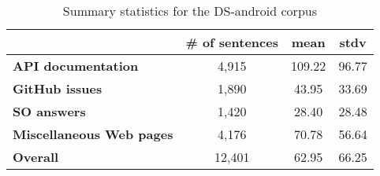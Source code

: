 \begin{table}[!h]
\centering    
\begin{small}
\begin{threeparttable}
\begin{tabular}{lccc}

\hline



 & \# of sentences & mean & stdv  \\

\hline
\hline

\textbf{API documentation} 
& 4,915 & 109.22 & 96.77
\\
\textbf{GitHub issues} 
& 1,890 &  43.95 & 33.69
\\
\textbf{SO answers} 
& 1,420 & 28.40 & 28.48 
\\
\textbf{Miscellaneous Web pages} 
& 4,176 & 70.78 & 56.64 
\\

\hline
\hline
\textbf{Overall} 
& 12,401 & 62.95 & 66.25 
\\
\hline

\end{tabular}
\end{threeparttable}
\end{small}
\caption{Summary statistics for the \acs{DS-android} corpus}
\label{tbl:corpus-summary}
\end{table}

